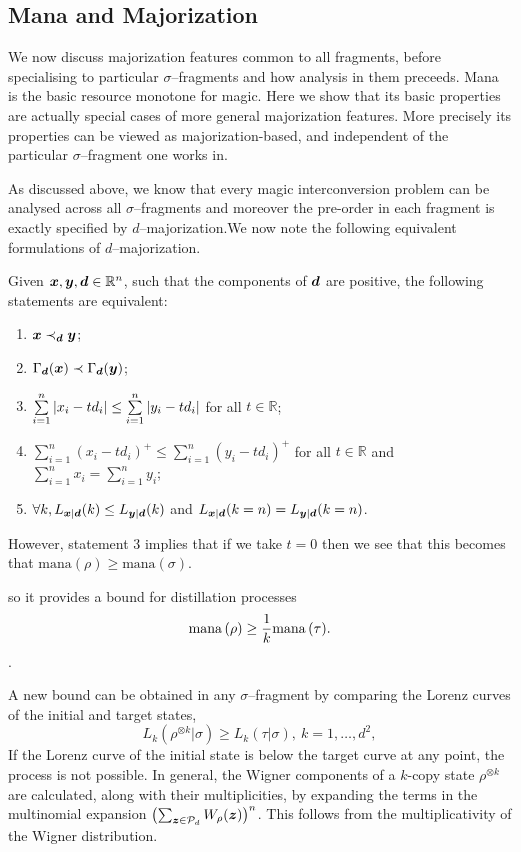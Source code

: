 \documentclass[pra,
aps,
twocolumn,
superscriptaddress,
groupedaddress,
nofootinbib,
reprint
]{revtex4-1}
\begin{document}
\subsection{Mana and Majorization}
We now discuss majorization features common to all fragments, before specialising to particular $\sigma$--fragments and how analysis in them preceeds. Mana is the basic resource monotone for magic. Here we show that its basic properties are actually special cases of more general majorization features. More precisely its properties can be viewed as majorization-based, and independent of the particular $\sigma$--fragment one works in.

As discussed above, we know that every magic interconversion problem can be analysed across all $\sigma$--fragments and moreover the pre-order in each fragment is exactly specified by $d$--majorization.We now note the following equivalent formulations of $d$--majorization.
\begin{theorem}
Given $\bm{x}, \bm{y}, \bm{d} \in \mathbb{R}^n$, such that the components of $\bm{d}$ are positive, the following statements are equivalent:
 \begin{enumerate}%
	\item $\bm{x} \prec_{\bm{d}} \bm{y}$;
	\item $\Gamma_{\bm{d}}({\bm{x}}) \prec \Gamma_{\bm{d}}({\bm{y}})$;
	\item\label{en:tm3} $\sum\limits_{i=1}^n \abs{x_i - t d_i} \leq \sum\limits_{i=1}^n \abs{y_i - t d_i}$ for all $t \in \mathbb{R}$;
	\item $\sum\limits_{i=1}^n (x_i - t d_i)^+ \leq \sum\limits_{i=1}^n (y_i - t d_i)^+$ for all $t \in \mathbb{R}$ and $\sum\limits_{i=1}^n x_i = \sum\limits_{i=1}^n y_i$;
	\item $\forall k, L_{\bm{x}|\bm{d}}(k) \leq L_{\bm{y}|\bm{d}}(k)$ and $L_{\bm{x}|\bm{d}}(k=n) = L_{\bm{y}|\bm{d}}(k=n)$.
 \end{enumerate}
\end{theorem}
However, statement 3 implies that if we take $t=0$ then we see that this becomes that $\mbox{mana}(\rho) \ge \mbox{mana}(\sigma)$. 

so it provides a bound for distillation processes
\begin{equation}
    {{\rm{mana}}\left(\rho\right)} \geq \frac{1}{k} {{\rm{mana}}\left(\tau\right)}.
\end{equation}.

A new bound can be obtained in any $\sigma$--fragment by comparing the Lorenz curves of the initial and target states,
\begin{equation}\label{eq:majbound}
    L_k(\rho^{\otimes k} | \sigma) \geq L_k (\tau | \sigma),\ k=1,\dots,d^2,
\end{equation}
If the Lorenz curve of the initial state is below the target curve at any point, the process is not possible.
In general, the Wigner components of a $k$-copy state $\rho^{\otimes k}$ are calculated, along with their multiplicities, by expanding the terms in the multinomial expansion $\left( \sum_{\bm{z} \in \mathcal{P}_d} W_\rho(\bm{z}) \right)^n$.
This follows from the multiplicativity of the Wigner distribution.
\end{document}
